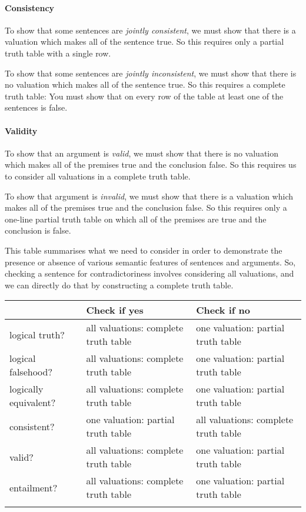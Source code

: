 \paragraph{Consistency}
To show that some sentences are \emph{jointly consistent}, we must show that there is a valuation which makes all of the sentence true. So this requires only a partial truth table with a single row. 

To show that some sentences are \emph{jointly inconsistent}, we must show that there is no valuation which makes all of the sentence true. So this requires a complete truth table: You must show that on every row of the table at least one of the sentences is false.

\paragraph{Validity}
To show that an argument is \emph{valid}, we must show that there is no valuation which makes all of the premises true and the conclusion false. So this  requires us to consider all valuations in a complete truth table.  

To show that argument is \emph{invalid}, we must show that there is a valuation which makes all of the premises true and the conclusion false. So this requires only a one-line partial truth table on which all of the premises are true and the conclusion is false. 

This table summarises what we need to consider in order to demonstrate the presence or absence of various semantic features of sentences and arguments. So, checking a sentence for contradictoriness involves considering all valuations, and we can directly do that by constructing a complete truth table. 
\begin{center}
\begin{tabular}{l p{4cm} p{4cm}} \toprule 
 & \textbf{Check if yes} & \textbf{Check if no}\\
 \midrule
logical truth? & all valuations: complete truth table & one valuation: partial truth table\\
logical falsehood? &  all valuations: complete truth table  & one valuation: partial truth table\\
logically equivalent? & all valuations: complete truth table & one valuation: partial truth table\\
consistent? & one valuation: partial truth table & all valuations: complete truth table\\
valid? & all valuations: complete truth table & one valuation: partial truth table\\
entailment? & all valuations: complete truth table & one valuation: partial truth table\\
\bottomrule \label{table.CompleteVsPartial}\end{tabular}
\end{center}

